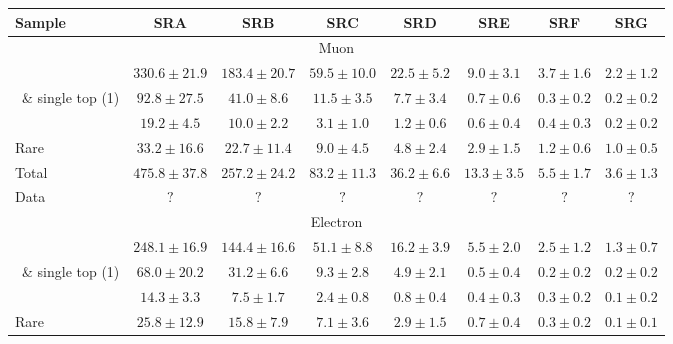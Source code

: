 
	\begin{table}[!h]																															
	\begin{center}																															
	{\footnotesize																															
	\begin{tabular}{l||c|c|c|c|c|c|c}																															
	\hline																															
	Sample		&	SRA			&	SRB			&	SRC			&	SRD			&	SRE			&	SRF			&	SRG\\				
	\hline																															
	\hline																															
	\multicolumn{8}{c}{Muon}	\\																														
	\hline																															
	\ttdl\  		&$	330.6	\pm	21.9	$&$	183.4	\pm	20.7	$&$	59.5	\pm	10.0	$&$	22.5	\pm	5.2	$&$	9.0	\pm	3.1	$&$	3.7	\pm	1.6	$&$	2.2	\pm	1.2	$	\\
	\ttsl\ \& single top (1\Lep) 		&$	92.8	\pm	27.5	$&$	41.0	\pm	8.6	$&$	11.5	\pm	3.5	$&$	7.7	\pm	3.4	$&$	0.7	\pm	0.6	$&$	0.3	\pm	0.2	$&$	0.2	\pm	0.2	$	\\
	\wjets\ 		&$	19.2	\pm	4.5	$&$	10.0	\pm	2.2	$&$	3.1	\pm	1.0	$&$	1.2	\pm	0.6	$&$	0.6	\pm	0.4	$&$	0.4	\pm	0.3	$&$	0.2	\pm	0.2	$	\\
	Rare 		&$	33.2	\pm	16.6	$&$	22.7	\pm	11.4	$&$	9.0	\pm	4.5	$&$	4.8	\pm	2.4	$&$	2.9	\pm	1.5	$&$	1.2	\pm	0.6	$&$	1.0	\pm	0.5	$	\\
	\hline																															
	Total 		&$	475.8	\pm	37.8	$&$	257.2	\pm	24.2	$&$	83.2	\pm	11.3	$&$	36.2	\pm	6.6	$&$	13.3	\pm	3.5	$&$	5.5	\pm	1.7	$&$	3.6	\pm	1.3	$	\\
	\hline																															
	\hline																															
	Data 		&$	?			$&$	?			$&$	?			$&$	?			$&$	?			$&$	?			$&$	?			$	\\
	\hline																															
	\hline																															
	\hline																															
	\multicolumn{8}{c}{Electron}	\\																														
	\hline																															
	\ttdl\  		&$	248.1	\pm	16.9	$&$	144.4	\pm	16.6	$&$	51.1	\pm	8.8	$&$	16.2	\pm	3.9	$&$	5.5	\pm	2.0	$&$	2.5	\pm	1.2	$&$	1.3	\pm	0.7	$	\\
	\ttsl\ \& single top (1\Lep) 		&$	68.0	\pm	20.2	$&$	31.2	\pm	6.6	$&$	9.3	\pm	2.8	$&$	4.9	\pm	2.1	$&$	0.5	\pm	0.4	$&$	0.2	\pm	0.2	$&$	0.2	\pm	0.2	$	\\
	\wjets\ 		&$	14.3	\pm	3.3	$&$	7.5	\pm	1.7	$&$	2.4	\pm	0.8	$&$	0.8	\pm	0.4	$&$	0.4	\pm	0.3	$&$	0.3	\pm	0.2	$&$	0.1	\pm	0.2	$	\\
	Rare 		&$	25.8	\pm	12.9	$&$	15.8	\pm	7.9	$&$	7.1	\pm	3.6	$&$	2.9	\pm	1.5	$&$	0.7	\pm	0.4	$&$	0.3	\pm	0.2	$&$	0.1	\pm	0.1	$	\\

\end{tabular}}
\end{center}
\end{table}
